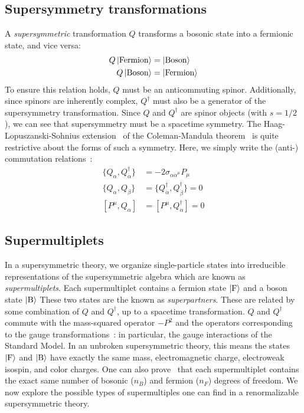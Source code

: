 \subsection{Supersymmetry transformations}

A \textit{supersymmetric} transformation $Q$ transforms a bosonic state into a fermionic state, and vice versa:
\begin{align}
Q \ket{\text{Fermion}} &= \ket{\text{Boson}} \\
Q \ket{\text{Boson}} &= \ket{\text{Fermion}}
\end{align}
To ensure this relation holds, $Q$ must be an anticommuting spinor.
Additionally, since spinors are inherently complex, $Q^\dagger$ must also be a generator of the supersymmetry transformation.
Since $Q$ and $Q^\dagger$ are spinor objects (with $s = 1/2$), we can see that supersymmetry must be a spacetime symmetry.
The Haag-Lopuszanski-Sohnius extension~\cite{Haag:1974qh} of the Coleman-Mandula theorem~\cite{Coleman:1967ad} is quite restrictive about the forms of such a symmetry.
Here, we simply write the (anti-) commutation relations~\cite{susyPrimer}:
\begin{align}
\{Q_\alpha, Q_{\dot{\alpha}}^\dagger\} &= -2 \sigma_{\alpha \dot{\alpha}^\mu} P_\mu \\
\{Q_\alpha,Q_{\dot{\beta}}\} &= \{Q_{\dot{\alpha}}^\dagger, Q_{\dot{\beta}}^\dagger\}  = 0 \\
[P^\mu , Q_{\alpha} ] &= [P^\mu, Q_{\dot{\alpha}}^\dagger] = 0
\end{align}

\subsection{Supermultiplets}\label{subsec:supermultiplets}

In a supersymmetric theory, we organize single-particle states into irreducible representations of the supersymmetric algebra which are known as \textit{supermultiplets}.
Each supermultiplet contains a fermion state $\ket{\text{F}}$ and a boson state $\ket{\text{B}}$
These two states are the known as \textit{superpartners}.
These are related by some combination of $Q$ and $Q^\dagger$, up to a spacetime transformation.
$Q$ and $Q^\dagger$ commute with the mass-squared operator $-P^2$ and the operators corresponding to the gauge transformations~\cite{susyPrimer}: in particular, the gauge interactions of the Standard Model.
In an unbroken supersymmetric theory, this means the states $\ket{\text{F}}$ and $\ket{\text{B}}$ have exactly the same mass, electromagnetic charge, electroweak isospin, and color charges.
One can also prove~\cite{susyPrimer} that each supermultiplet contains the exact same number of bosonic ($n_B$) and fermion ($n_F$) degrees of freedom.
We now explore the possible types of supermultiples one can find in a renormalizable supersymmetric theory.

